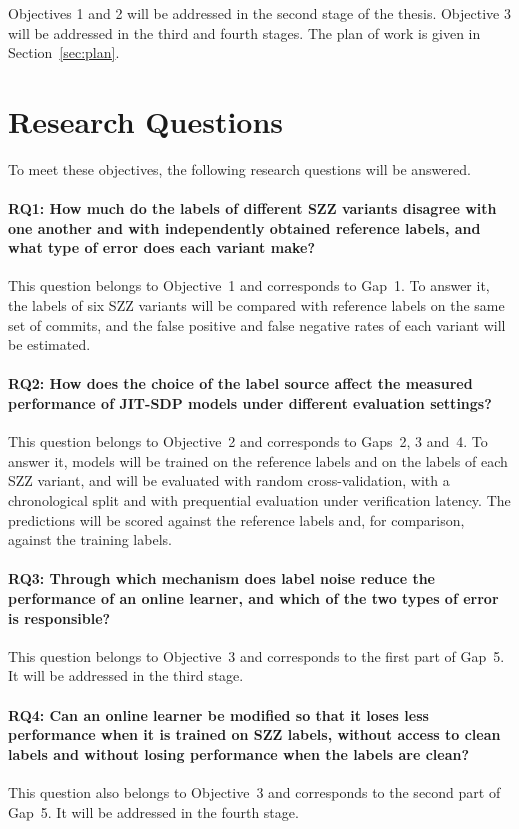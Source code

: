 \documentclass[12pt,a4paper,oneside]{report}
\begin{document}
Objectives 1 and 2 will be addressed in the second stage of the thesis.
Objective 3 will be addressed in the third and fourth stages. The plan of
work is given in Section~\ref{sec:plan}.

\section{Research Questions}

To meet these objectives, the following research questions will be answered.

\paragraph{RQ1: How much do the labels of different SZZ variants disagree with one
another and with independently obtained reference labels, and what type of
error does each variant make?}
This question belongs to Objective~1 and corresponds to Gap~1. To answer it,
the labels of six SZZ variants will be compared with reference labels on the
same set of commits, and the false positive and false negative rates of each
variant will be estimated.

\paragraph{RQ2: How does the choice of the label source affect the measured
performance of JIT-SDP models under different evaluation settings?}
This question belongs to Objective~2 and corresponds to Gaps~2, 3 and~4. To
answer it, models will be trained on the reference labels and on the labels
of each SZZ variant, and will be evaluated with random cross-validation, with
a chronological split and with prequential evaluation under verification
latency. The predictions will be scored against the reference labels and,
for comparison, against the training labels.

\paragraph{RQ3: Through which mechanism does label noise reduce the performance of
an online learner, and which of the two types of error is responsible?}
This question belongs to Objective~3 and corresponds to the first part of
Gap~5. It will be addressed in the third stage.

\paragraph{RQ4: Can an online learner be modified so that it loses less
performance when it is trained on SZZ labels, without access to clean labels
and without losing performance when the labels are clean?}
This question also belongs to Objective~3 and corresponds to the second part
of Gap~5. It will be addressed in the fourth stage.
\end{document}
